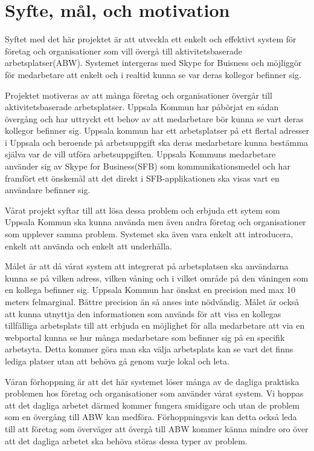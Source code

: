 \documentclass[a4paper,12pt]{article}
\begin{document}


\section{Syfte, mål, och motivation}
Syftet med det här projektet är att utveckla ett enkelt och effektivt system för företag och organisationer som vill övergå till aktivitetsbaserade arbetsplatser(ABW). Systemet intergeras med Skype for Buisness och möjliggör för medarbetare att enkelt och i realtid kunna se var deras kollegor befinner sig.

Projektet motiveras av att många företag och organisationer övergår till aktivitetsbaserade arbetsplatser. Uppsala Kommun har påbörjat en sådan övergång och har uttryckt ett behov av att medarbetare bör kunna se vart deras kollegor befinner sig. Uppsala kommun har ett arbetsplatser på ett flertal adresser i Uppsala och beroende på arbetsuppgift ska deras medarbetare kunna bestämma själva var de vill utföra arbetsuppgiften. Uppsala Kommuns medarbetare använder sig av Skype for Business(SFB) som kommunikationsmedel och har framfört ett önskemål att det direkt i SFB-applikationen ska visas vart en användare befinner sig.

Vårat projekt syftar till att lösa dessa problem och erbjuda ett sytem som Uppsala Kommun ska kunna använda men även andra företag och organisationer som upplever samma problem. Systemet ska även vara enkelt att introducera, enkelt att använda och enkelt att underhålla.

Målet är att då vårat system att integrerat på arbetsplatsen ska användarna kunna se på vilken adress, vilken våning och i vilket område på den våningen som en kollega befinner sig. Uppsala Kommun har önskat en precision med max 10 meters felmarginal. Bättre precision än så anses inte nödvändig. Målet är också att kunna utnyttja den informationen som används för att visa en kollegas tillfälliga arbetsplats till att erbjuda en möjlighet för alla medarbetare att via en webportal kunna se hur många medarbetare som befinner sig på en specifik arbetsyta. Detta kommer göra man ska välja arbetsplats kan se vart det finns lediga platser utan att behöva gå genom varje lokal och leta.

Våran förhoppning är att det här systemet löser många av de dagliga praktiska problemen hos företag och organisationer som använder vårat system. Vi hoppas att det dagliga arbetet därmed kommer fungera smidigare och utan de problem som en övergång till ABW kan medföra. Förhoppningsvis kan detta också leda till att företag som överväger att övergå till ABW kommer känna mindre oro över att det dagliga arbetet ska behöva störas dessa typer av problem.
\end{document}

